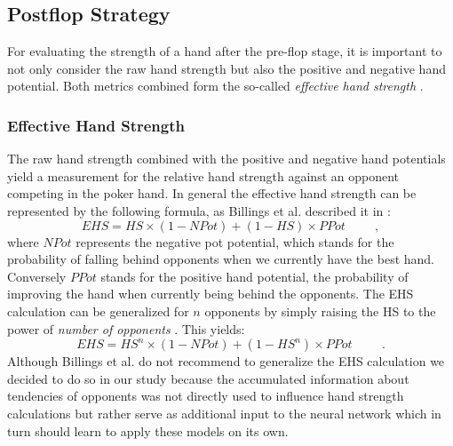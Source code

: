 \subsection{Postflop Strategy}
For evaluating the strength of a hand after the pre-flop stage, it is important to not only consider the raw hand strength but also the positive and negative hand potential. Both metrics combined form the so-called \textit{effective hand strength} \cite{pena}.
\subsubsection{Effective Hand Strength}
\label{subsubsec:ehs}
The raw hand strength combined with the positive and negative hand potentials yield a measurement for the relative hand strength against an opponent competing in the poker hand. In general the effective hand strength can be represented by the following formula, as Billings et al. described it in \cite[p. 216]{challenge_of_poker}:
\begin{equation}
\label{eq:ehs}
EHS = HS \times (1 - NPot) + (1-HS) \times PPot \hspace{1cm},
\end{equation}
where $NPot$ represents the negative pot potential, which stands for the probability of falling behind opponents when we currently have the best hand. Conversely $PPot$ stands for the positive hand potential, the probability of improving the hand when currently being behind the opponents. The EHS calculation can be generalized for $n$ opponents by simply raising the HS to the power of \textit{number of opponents} \cite{opp_modeling}. This yields:
\begin{equation}
\label{eq:ehs_n_opp}
EHS = HS^{n} \times (1 - NPot) + (1-HS^{n}) \times PPot \hspace{1cm}.
\end{equation}
Although Billings et al. do not recommend to generalize the EHS calculation we decided to do so in our study because the accumulated information about tendencies of opponents was not directly used to influence hand strength calculations but rather serve as additional input to the neural network which in turn should learn to apply these models on its own.

